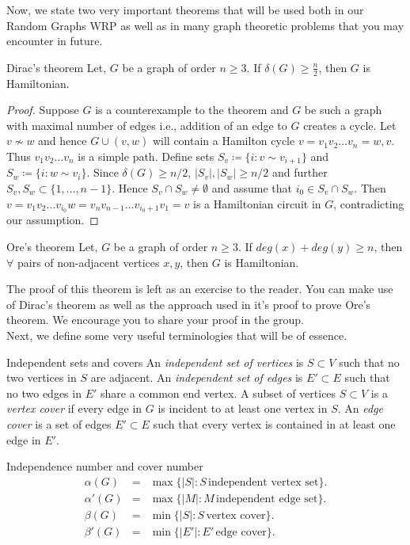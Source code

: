 \documentclass[../basic_graph_theory.tex]{subfiles}
\begin{document}
Now, we state two very important theorems that will be used both in our Random Graphs WRP as well as in many graph theoretic problems that you may encounter in future.

\begin{Thm}{Dirac's theorem}{}
    Let, $G$ be a graph of order $n \ge 3$. If $\delta(G) \ge \frac{n}{2}$, then $G$ is Hamiltonian.
\end{Thm}
\begin{proof}
    Suppose $G$ is a counterexample to the theorem and $G$ be such a graph with maximal number of edges i.e., addition of an edge to $G$ creates a cycle.  Let $v \nsim w$ and hence $G \cup (v,w)$ will contain a Hamilton cycle $v = v_1v_2\ldots v_n=w,v$. Thus $v_1v_2\ldots v_n$ is a simple path. Define sets $S_v \coloneqq \{ i : v \sim v_{i+1} \}$ and $S_w \coloneqq \{ i : w \sim v_i\}$. Since $\delta(G) \geq n/2$, $|S_v|, |S_w| \geq n/2$ and further $S_v, S_w \subset \{1,\ldots,n-1\}$. Hence $S_v \cap S_w \neq \emptyset$ and assume that $i_0 \in S_v \cap S_w$. Then $v = v_1v_2\ldots v_{i_0}w=v_nv_{n-1}\ldots v_{i_0+1}v_1=v$ is a Hamiltonian circuit in $G$, contradicting our assumption.
\end{proof}

\begin{Thm}{Ore's theorem}{}
    Let, $G$ be a graph of order $n \ge 3$. If $deg(x)+deg(y) \ge n$, then $\forall$ pairs of non-adjacent vertices $x,y$, then $G$ is Hamiltonian.
\end{Thm}

The proof of this theorem is left as an exercise to the reader. You can make use of Dirac's theorem as well as the approach used in it's proof to prove Ore's theorem. We encourage you to share your proof in the group.\\
Next, we define some very useful terminologies that will be of essence.\\

\begin{Def}{Independent sets and covers}{}  
    An {\em independent set of vertices} is $S \subset V$ such that no two vertices in $S$ are adjacent. An {\em independent set of edges} is $E' \subset E$ such that no two edges in $E'$ share a common end vertex. A subset of vertices $S \subset V$ is a {\em vertex cover} if every edge in $G$ is incident to at least one vertex in $S$. An {\em edge cover} is a set of edges $E' \subset E$ such that every vertex is contained in at least one edge in $E'$.
\end{Def}
\begin{Def}{Independence number and cover number}{}
    \begin{eqnarray*}
        \alpha(G) & = & \max \{|S| : S \, \mbox{independent vertex set} \}. \\
        \alpha'(G) & = & \max \{|M| : M \, \mbox{independent edge set} \}. \\
        \beta(G) & = & \min \{|S| : S \, \mbox{vertex cover} \}.  \\
        \beta'(G) & = & \min \{|E'| : E' \, \mbox{edge cover} \}.
    \end{eqnarray*}
\end{Def}
\end{document}
